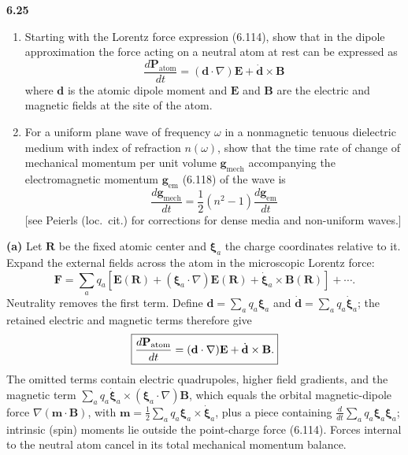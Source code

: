 \par\bigskip
\noindent\textbf{6.25}\quad\begin{enumerate}
\item[(a)] Starting with the Lorentz force expression (6.114), show that in the dipole approximation the force acting on a neutral atom at rest can be expressed as
\[
\frac{d\mathbf{P}_{\mathrm{atom}}}{dt}=(\mathbf{d}\cdot\nabla)\mathbf{E}+\dot{\mathbf{d}}\times\mathbf{B}
\]
where $\mathbf{d}$ is the atomic dipole moment and $\mathbf{E}$ and $\mathbf{B}$ are the electric and magnetic fields at the site of the atom.
\item[(b)] For a uniform plane wave of frequency $\omega$ in a nonmagnetic tenuous dielectric medium with index of refraction $n(\omega)$, show that the time rate of change of mechanical momentum per unit volume $\mathbf{g}_{\mathrm{mech}}$ accompanying the electromagnetic momentum $\mathbf{g}_{\mathrm{em}}$ (6.118) of the wave is
\[
\frac{d\mathbf{g}_{\mathrm{mech}}}{dt}=\frac{1}{2}\left(n^{2}-1\right)\frac{d\mathbf{g}_{\mathrm{em}}}{dt}
\]
[see Peierls (loc.\ cit.) for corrections for dense media and non-uniform waves.]
\end{enumerate}
\solution

\textbf{(a)} Let $\mathbf R$ be the fixed atomic center and
$\boldsymbol\xi_a$ the charge coordinates relative to it. Expand the
external fields across the atom in the microscopic Lorentz force:
\[
\mathbf F=\sum_aq_a\left[
\mathbf E(\mathbf R)+(\boldsymbol\xi_a\cdot\nabla)\mathbf E(\mathbf R)
+\dot{\boldsymbol\xi}_a\times\mathbf B(\mathbf R)\right]+\cdots.
\]
Neutrality removes the first term. Define
$\mathbf d=\sum_aq_a\boldsymbol\xi_a$ and
$\dot{\mathbf d}=\sum_aq_a\dot{\boldsymbol\xi}_a$; the retained electric
and magnetic terms therefore give
\[
\boxed{\frac{d\mathbf P_{\rm atom}}{dt}
=(\mathbf d\cdot\nabla)\mathbf E+\dot{\mathbf d}\times\mathbf B.}
\]
The omitted terms contain electric quadrupoles, higher field gradients,
and the magnetic term
$\sum_aq_a\dot{\boldsymbol\xi}_a\times(\boldsymbol\xi_a\cdot\nabla)\mathbf B$,
which equals the orbital magnetic-dipole force
$\nabla(\mathbf m\cdot\mathbf B)$, with
$\mathbf m=\frac12\sum_aq_a\boldsymbol\xi_a\times\dot{\boldsymbol\xi}_a$,
plus a piece containing
$\frac{d}{dt}\sum_aq_a\boldsymbol\xi_a\boldsymbol\xi_a$; intrinsic (spin)
moments lie outside the point-charge force (6.114). Forces internal to the neutral atom
cancel in its total mechanical momentum balance.

